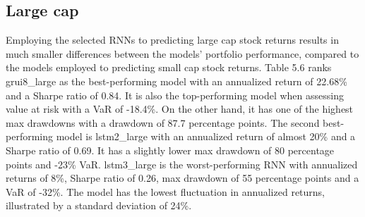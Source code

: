 \subsection{Large cap}
\begin{table}[ht]
\centering
{}
\caption{Large cap trading performance (long, K=5)}
\end{table}
\indent\newline 
Employing the selected RNNs to predicting large cap stock returns  results in much smaller differences between the models' portfolio performance, compared to the models employed to predicting small cap stock returns. Table 5.6 ranks grui8\_large as the best-performing model with an annualized return of 22.68\% and a Sharpe ratio of 0.84. It is also the top-performing model when assessing value at risk with a VaR of -18.4\%. On the other hand, it has one of the highest max drawdowns with a drawdown of 87.7 percentage points. The second best-performing model is lstm2\_large with an annualized return of almost 20\% and a Sharpe ratio of 0.69. It has a slightly lower max drawdown of 80 percentage points and -23\% VaR. lstm3\_large is the worst-performing RNN with annualized returns of 8\%, Sharpe ratio of 0.26, max drawdown of 55 percentage points and a VaR of -32\%. The model has the lowest fluctuation in annualized returns, illustrated by a standard deviation of 24\%.
\indent\newline 
